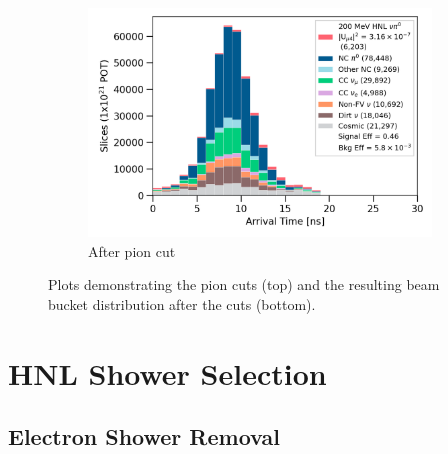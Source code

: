 \begin{figure}[h!]
\begin{subfigure}[b]{0.495\textwidth}
            \includegraphics[width=\textwidth]{beam_bucket_postpion}
            \caption{After pion cut}%
            \label{fig:bb_post_pion}
        \end{subfigure}
        \caption{
		Plots demonstrating the pion cuts (top) and the resulting beam bucket distribution after the cuts (bottom). 
	}
        \label{fig:razzled_pion_cut}
\end{figure}
\section{HNL Shower Selection}
\label{sec:hnl_shower_select}

\subsection{Electron Shower Removal}


